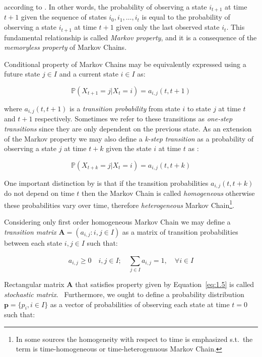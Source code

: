 according to \citep{Praskova2012}. In other words, the probability of observing a state $i_{t+1}$ at time $t+1$ given the sequence of states $i_0,i_1,\ldots,i_{t}$ is equal to the probability of observing a state $i_{t+1}$ at time $t+1$ given only the last observed state $i_t$.
This fundamental relationship is called \textit{Markov property}, and it is a consequence of the \textit{memoryless property} of Markov Chains.~\citep{Haggstrom2002}

Conditional property of Markov Chains may be equivalently expressed using a future state $j \in I$ and a current state $i \in I$ as:

\begin{equation}
    \mathbb{P}(X_{t+1}=j|X_t=i) = a_{i,j}(t,t+1)
\end{equation}

where $a_{i,j}(t,t+1)$ is a \textit{transition probability} from state $i$ to state $j$ at time $t$ and $t+1$ respectively. Sometimes we refer to these transitions as \textit{one-step transitions} since they are only dependent on the previous state.
As an extension of the Markov property we may also define a \textit{k-step transition} as a probability of observing a state $j$ at time $t+k$ given the state $i$ at time $t$ as \citep{Tolver2016}:

\begin{equation}
    \mathbb{P}(X_{t+k}=j|X_t=i) = a_{i,j}(t,t+k)
\end{equation}

One important distinction by \citep{Weinan2019} is that if the transition probabilities $a_{i,j}(t,t+k)$ do not depend on time $t$ then the Markov Chain is called \textit{homogeneous} otherwise these probabilities vary over time, therefore \textit{heterogeneous} Markov Chain\footnote{In some sources the homogeneity with respect to time is emphasized s.t.\ the term is time-homogeneous or time-heterogenuous Markov Chain.}.

Considering only first order homogeneous Markov Chain we may define a \textit{transition matrix} 
$\textbf{A} = (a_{i,j} : i,j \in I)$ as a matrix of transition probabilities between each state $i,j \in I$ such that:

\begin{equation} \label{eq:1.5}
    a_{i,j} \geq 0 \quad i,j \in I; \quad \sum\limits_{j \in I} ^{}a_{i,j} = 1, \quad \forall i \in I
\end{equation}

Rectangular matrix $\textbf{A}$ that satisfies property given by Equation~\ref{eq:1.5} is called \textit{stochastic matrix}.~\citep{Gagniuc2017}
Furthermore, we ought to define a probability distribution $\textbf{p} =\{p_i, i \in I\} $ as a vector of probabilities of observing each state at time $t=0$ such that:

